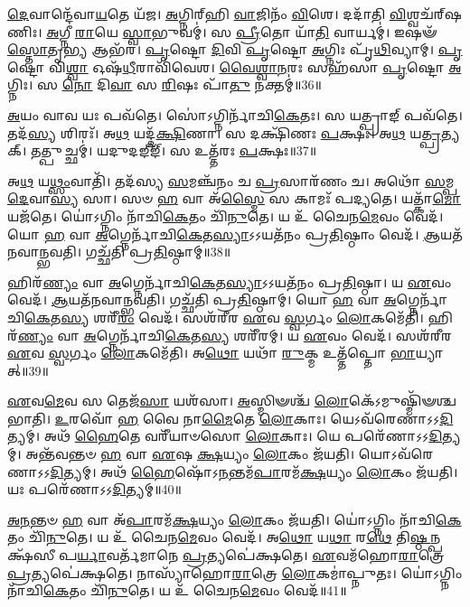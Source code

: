   \ul{𑌦𑍇}\-𑌵𑌾𑌨𑍍𑌦𑍇᳴𑌵𑌾\-\ul{𑌯}\-𑌤𑍇 𑌯᳴𑌜।
   \ul{𑌅}\-𑌗𑍍𑌨𑌿𑌰𑍍{‌}𑌹𑌿 \ul{𑌵𑌾}\-𑌜𑌿𑌨𑌂᳴ \ul{𑌵𑌿}\-𑌶𑍇।
   𑌦𑌦𑌾᳴𑌤𑌿 \ul{𑌵𑌿}\-𑌶𑍍𑌵𑌚᳴𑌰𑍍{‌}𑌷𑌣𑌿𑌃।
   \ul{𑌅}\-𑌗𑍍𑌨𑍀 \ul{𑌰𑌾}\-𑌯𑍇 \ul{𑌸𑍍𑌵𑌾}\-𑌭𑍁𑌵𑌮𑍍॑।
   𑌸 \ul{𑌪𑍍𑌰𑍀}\-𑌤𑍋 𑌯𑌾᳴\-\ul{𑌤𑌿} 𑌵𑌾𑌰𑍍𑌯𑌮𑍍॑।
   𑌇𑌷𑍟᳴ \ul{𑌸𑍍𑌤𑍋}\-𑌤𑍃\-\ul{𑌭𑍍𑌯} 𑌆𑌭᳴𑌰।
   \ul{𑌪𑍃}\-𑌷𑍍𑌟𑍋 \ul{𑌦𑌿}\-𑌵𑌿 \ul{𑌪𑍃}\-𑌷𑍍𑌟𑍋 \ul{𑌅}\-𑌗𑍍𑌨𑌿𑌃 𑌪𑍃᳴\-\ul{𑌥𑌿}\-𑌵𑍍𑌯𑌾𑌮𑍍।
   \ul{𑌪𑍃}\-𑌷𑍍𑌟𑍋 𑌵𑌿\-\ul{𑌶𑍍𑌵𑌾} 𑌓𑌷᳴\-\ul{𑌧𑍀}\-𑌰𑌾𑌵𑌿᳴𑌵𑍇𑌶।
   \ul{𑌵𑍈}\-\-\ul{𑌶𑍍𑌵𑌾}\-\-\ul{𑌨}\-𑌰𑌃 𑌸𑌹᳴𑌸𑌾 \ul{𑌪𑍃}\-𑌷𑍍𑌟𑍋 \ul{𑌅}\-𑌗𑍍𑌨𑌿𑌃।
   𑌸 \ul{𑌨𑍋} 𑌦𑌿\-\ul{𑌵𑌾} 𑌸 \ul{𑌰𑌿}\-𑌷𑌃 𑌪𑌾᳴\-\ul{𑌤𑍁} 𑌨𑌕𑍍𑌤𑌮𑍍॑॥36॥
\anuvakamend
  
   \ul{𑌅}\-𑌯𑌂 𑌵𑌾𑌵 𑌯𑌃 𑌪𑌵᳴𑌤𑍇।
   𑌸𑍋॑𑌽𑌗𑍍𑌨𑌿𑌰𑍍𑌨𑌾᳴𑌚𑌿\-\ul{𑌕𑍇}\-𑌤𑌃।
   𑌸 𑌯𑌤𑍍𑌪𑍍𑌰𑌾𑌙𑍍 𑌪𑌵᳴𑌤𑍇।
   𑌤𑌦᳴\-\ul{𑌸𑍍𑌯} 𑌶𑌿𑌰𑌃᳴।
   𑌅\-\ul{𑌥} 𑌯𑌦𑍍𑌦᳴\-\ul{𑌕𑍍𑌷𑌿}\-𑌣𑌾।
   𑌸 𑌦𑌕𑍍𑌷𑌿᳴𑌣𑌃 \ul{𑌪}\-𑌕𑍍𑌷𑌃।
   𑌅\-\ul{𑌥} 𑌯\-\ul{𑌤𑍍𑌪𑍍𑌰}\-𑌤𑍍𑌯𑌕𑍍।
   𑌤𑌤𑍍𑌪𑍁𑌚𑍍𑌛𑌮𑍍॑।
   𑌯𑌦𑍁𑌦𑌙𑍍‌𑌙𑍍᳴।
   𑌸 𑌉𑌤𑍍𑌤᳴𑌰𑌃 \ul{𑌪}\-𑌕𑍍𑌷𑌃॥37॥

   𑌅\-\ul{𑌥} 𑌯\-\ul{𑌥𑍍𑌸𑌂}\-𑌵𑌾𑌤𑌿᳴।
   𑌤𑌦᳴𑌸𑍍𑌯 \ul{𑌸}\-𑌮𑌞𑍍𑌚᳴𑌨𑌂 𑌚 \ul{𑌪𑍍𑌰}\-𑌸𑌾𑌰᳴𑌣𑌂 𑌚।
   𑌅𑌥𑍋᳴ \ul{𑌸}\-𑌮𑍍𑌪\-\ul{𑌦𑍇}\-𑌵𑌾\-\ul{𑌸𑍍𑌯} 𑌸𑌾।
   𑌸𑍞 \ul{𑌹} 𑌵𑌾 𑌅᳴\-\ul{𑌸𑍍𑌮𑍈} 𑌸 𑌕𑌾𑌮𑌃᳴ 𑌪𑌦𑍍𑌯𑌤𑍇।
   𑌯𑌤𑍍𑌕𑌾᳴\-\ul{𑌮𑍋} 𑌯𑌜᳴𑌤𑍇।
   𑌯𑍋॑𑌽𑌗𑍍𑌨𑌿𑌂 𑌨𑌾᳴𑌚𑌿\-\ul{𑌕𑍇}\-𑌤𑌂 𑌚𑌿᳴\-\ul{𑌨𑍁}\-𑌤𑍇।
   𑌯 𑌉᳴ 𑌚𑍈𑌨\-\ul{𑌮𑍇}\-𑌵𑌂 𑌵𑍇𑌦᳴।
   𑌯𑍋 \ul{𑌹} 𑌵𑌾 \ul{𑌅}\-𑌗𑍍𑌨𑍇𑌰𑍍𑌨𑌾᳴𑌚𑌿\-\ul{𑌕𑍇}\-𑌤\-\ul{𑌸𑍍𑌯𑌾}\-𑌽𑌽𑌯𑌤᳴𑌨𑌂 𑌪𑍍𑌰\-\ul{𑌤𑌿}\-𑌷𑍍𑌠𑌾𑌂 𑌵𑍇𑌦᳴।
   \ul{𑌆}\-𑌯𑌤᳴𑌨𑌵𑌾𑌨𑍍𑌭𑌵𑌤𑌿।
   𑌗𑌚𑍍𑌛᳴𑌤𑌿 𑌪𑍍𑌰\-\ul{𑌤𑌿}\-𑌷𑍍𑌠𑌾𑌮𑍍॥38॥

   𑌹𑌿𑌰᳴\-\ul{𑌣𑍍𑌯𑌂} 𑌵𑌾 \ul{𑌅}\-𑌗𑍍𑌨𑍇𑌰𑍍𑌨𑌾᳴𑌚𑌿\-\ul{𑌕𑍇}\-𑌤\-\ul{𑌸𑍍𑌯𑌾}\-𑌽𑌽𑌯𑌤᳴𑌨𑌂 𑌪𑍍𑌰\-\ul{𑌤𑌿}\-𑌷𑍍𑌠𑌾।
   𑌯 \ul{𑌏}\-𑌵𑌂 𑌵𑍇𑌦᳴।
   \ul{𑌆}\-𑌯𑌤᳴𑌨𑌵𑌾𑌨𑍍𑌭𑌵𑌤𑌿।
   𑌗𑌚𑍍𑌛᳴𑌤𑌿 𑌪𑍍𑌰\-\ul{𑌤𑌿}\-𑌷𑍍𑌠𑌾𑌮𑍍।
   𑌯𑍋 \ul{𑌹} 𑌵𑌾 \ul{𑌅}\-𑌗𑍍𑌨𑍇𑌰𑍍𑌨𑌾᳴𑌚𑌿\-\ul{𑌕𑍇}\-𑌤\-\ul{𑌸𑍍𑌯} 𑌶𑌰𑍀᳴\-\ul{𑌰𑌂} 𑌵𑍇𑌦᳴।
   𑌸𑌶᳴𑌰𑍀𑌰 \ul{𑌏}\-𑌵 \ul{𑌸𑍍𑌵}\-𑌰𑍍𑌗𑌂 \ul{𑌲𑍋}\-𑌕𑌮𑍇᳴𑌤𑌿।
   𑌹𑌿𑌰᳴\-\ul{𑌣𑍍𑌯𑌂} 𑌵𑌾 \ul{𑌅}\-𑌗𑍍𑌨𑍇𑌰𑍍𑌨𑌾᳴𑌚𑌿\-\ul{𑌕𑍇}\-𑌤\-\ul{𑌸𑍍𑌯} 𑌶𑌰𑍀᳴𑌰𑌮𑍍।
   𑌯 \ul{𑌏}\-𑌵𑌂 𑌵𑍇𑌦᳴।
   𑌸𑌶᳴𑌰𑍀𑌰 \ul{𑌏}\-𑌵 \ul{𑌸𑍍𑌵}\-𑌰𑍍𑌗𑌂 \ul{𑌲𑍋}\-𑌕𑌮𑍇᳴𑌤𑌿।
   𑌅\-\ul{𑌥𑍋} 𑌯𑌥𑌾᳴ \ul{𑌰𑍁}\-𑌕𑍍𑌮 𑌉𑌤𑍍𑌤᳴𑌪𑍍𑌤𑍋 \ul{𑌭𑌾}\-𑌯𑍍𑌯𑌾𑌤𑍍॥39॥

   \ul{𑌏}\-𑌵\-\ul{𑌮𑍇}\-𑌵 𑌸 𑌤𑍇𑌜᳴\-\ul{𑌸𑌾} 𑌯𑌶᳴𑌸𑌾।
   \ul{𑌅}\-𑌸𑍍𑌮𑌿𑍟𑌶𑍍𑌚᳴ \ul{𑌲𑍋}\-𑌕𑍇᳴𑌽𑌮𑍁𑌷𑍍𑌮𑌿᳴𑍟𑌶𑍍𑌚 𑌭𑌾𑌤𑌿।
   \ul{𑌉}\-𑌰𑌵𑍋᳴ \ul{𑌹} 𑌵𑍈 𑌨𑌾\-\ul{𑌮𑍈}\-𑌤𑍇 \ul{𑌲𑍋}\-𑌕𑌾𑌃।
   𑌯𑍇𑌽𑌵᳴𑌰𑍇𑌣𑌾𑌽𑌽\-\ul{𑌦𑌿}\-𑌤𑍍𑌯𑌮𑍍।
   𑌅𑌥᳴ \ul{𑌹𑍈}\-𑌤𑍇 𑌵𑌰𑍀᳴𑌯𑌾𑍞𑌸𑍋 \ul{𑌲𑍋}\-𑌕𑌾𑌃।
   𑌯𑍇 𑌪𑌰𑍇᳴𑌣𑌾𑌽𑌽\-\ul{𑌦𑌿}\-𑌤𑍍𑌯𑌮𑍍।
   𑌅𑌨𑍍𑌤᳴𑌵𑌨𑍍𑌤𑍞 \ul{𑌹} 𑌵𑌾 \ul{𑌏}\-𑌷 \ul{𑌕𑍍𑌷}\-𑌯𑍍𑌯𑌂 \ul{𑌲𑍋}\-𑌕𑌂 𑌜᳴𑌯𑌤𑌿।
   𑌯𑍋𑌽𑌵᳴𑌰𑍇𑌣𑌾𑌽𑌽\-\ul{𑌦𑌿}\-𑌤𑍍𑌯𑌮𑍍।
   𑌅𑌥᳴ \ul{𑌹𑍈}\-𑌷𑍋᳴𑌽\-\ul{𑌨}\-𑌨𑍍𑌤𑌮᳴\-\ul{𑌪𑌾}\-𑌰𑌮᳴\-\ul{𑌕𑍍𑌷}\-𑌯𑍍𑌯𑌂 \ul{𑌲𑍋}\-𑌕𑌂 𑌜᳴𑌯𑌤𑌿।
   𑌯𑌃 𑌪𑌰𑍇᳴𑌣𑌾𑌽𑌽\-\ul{𑌦𑌿}\-𑌤𑍍𑌯𑌮𑍍॥40॥
   
   \ul{𑌅}\-\-\ul{𑌨}\-𑌨𑍍𑌤𑍞 \ul{𑌹} 𑌵𑌾 𑌅᳴\-\ul{𑌪𑌾}\-𑌰𑌮᳴\-\ul{𑌕𑍍𑌷}\-𑌯𑍍𑌯𑌂 \ul{𑌲𑍋}\-𑌕𑌂 𑌜᳴𑌯𑌤𑌿।
   𑌯𑍋॑𑌽𑌗𑍍𑌨𑌿𑌂 𑌨𑌾᳴𑌚𑌿\-\ul{𑌕𑍇}\-𑌤𑌂 𑌚𑌿᳴\-\ul{𑌨𑍁}\-𑌤𑍇।
   𑌯 𑌉᳴ 𑌚𑍈𑌨\-\ul{𑌮𑍇}\-𑌵𑌂 𑌵𑍇𑌦᳴।
   𑌅\-\ul{𑌥𑍋} 𑌯\-\ul{𑌥𑌾} 𑌰\-\ul{𑌥𑍇} 𑌤𑌿\-\ul{𑌷𑍍𑌠}\-𑌨𑍍𑌪𑌕𑍍𑌷᳴𑌸𑍀 𑌪\-\ul{𑌰𑍍𑌯𑌾}\-𑌵𑌰𑍍𑌤᳴𑌮𑌾𑌨𑍇 \ul{𑌪𑍍𑌰}\-𑌤𑍍𑌯𑌪𑍇॑𑌕𑍍𑌷𑌤𑍇।
   \ul{𑌏}\-𑌵𑌮᳴𑌹𑍋\-\ul{𑌰𑌾}\-𑌤𑍍𑌰𑍇 \ul{𑌪𑍍𑌰}\-𑌤𑍍𑌯𑌪𑍇॑𑌕𑍍𑌷𑌤𑍇।
   𑌨𑌾𑌸𑍍𑌯𑌾᳴𑌹𑍋\-\ul{𑌰𑌾}\-𑌤𑍍𑌰𑍇 \ul{𑌲𑍋}\-𑌕𑌮𑌾॑𑌪𑍍𑌨𑍁𑌤𑌃।
   𑌯𑍋॑𑌽𑌗𑍍𑌨𑌿𑌂 𑌨𑌾᳴𑌚𑌿\-\ul{𑌕𑍇}\-𑌤𑌂 𑌚𑌿᳴\-\ul{𑌨𑍁}\-𑌤𑍇।
   𑌯 𑌉᳴ 𑌚𑍈𑌨\-\ul{𑌮𑍇}\-𑌵𑌂 𑌵𑍇𑌦᳴॥41॥
\anuvakamend
  
